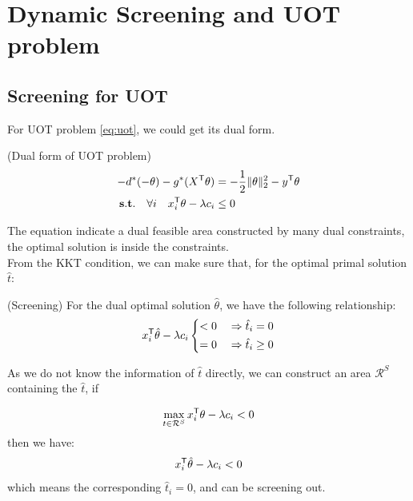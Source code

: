\section{Dynamic Screening and UOT problem}
\subsection{Screening for UOT}

For UOT problem \ref{eq:uot}, we could get its dual form. 
\begin{lem}(Dual form of UOT problem)
\begin{equation}
\begin{split}
-d^*(-\theta) - g^*(X^{\mathsf T}\theta)& = -\frac{1}{2}\|\theta\|_2^2-y^{\mathsf T}\theta \\
 \mathbf{s.t.} \quad \forall i \quad x_i^{\mathsf T}\theta -\lambda c_i &\leq 0
 \end{split}
 \label{eq:uotdual}
\end{equation}
\end{lem}
The equation indicate a dual feasible area constructed by many dual constraints, the optimal solution is inside the constraints.\\
From the KKT condition, we can make sure that, for the optimal primal solution $\hat{t}$:
\begin{thm} (Screening) For the dual optimal solution $\hat{\theta}$, we have the following relationship:
 \begin{equation}
\begin{split}
x_i^{\mathsf T}\hat{\theta} -\lambda c_i  \left\{
\begin{aligned}
< 0 \quad& \Rightarrow \hat{t}_i = 0\\
= 0 \quad& \Rightarrow \hat{t}_i \geq 0
\end{aligned}
\right.
 \end{split}
 \label{eq:screening}
\end{equation}
\end{thm}

As we do not know the information of $\hat{t}$ directly, we can construct an area $\mathcal{R}^{S}$ containing the $\hat{t}$, if

 \begin{equation}
\max_{t \in \mathcal{R}^S} x_i^{\mathsf T}\theta -\lambda c_i  < 0
\end{equation}
then we have:
 \begin{equation}
 x_i^{\mathsf T}\hat{\theta} -\lambda c_i  < 0
\end{equation}
which means the corresponding $\hat{t}_i = 0$, and can be screening out.

